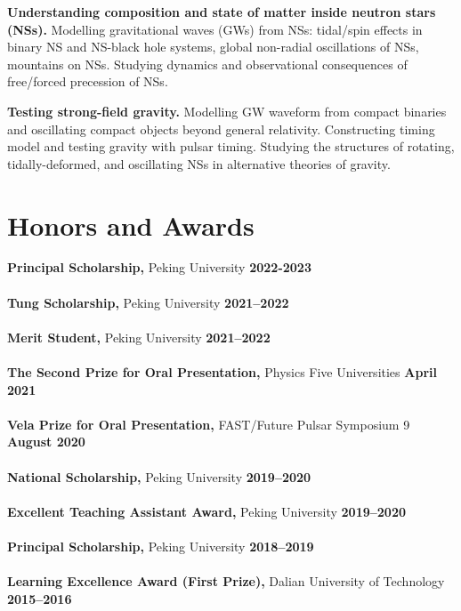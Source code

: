 \documentclass[margin,line]{res}
\begin{document}
\begin{resume}
{\bf Understanding composition and state of matter inside neutron stars (NSs).} Modelling gravitational waves (GWs) from NSs: tidal/spin effects in binary NS and NS-black hole systems, global non-radial oscillations of NSs, mountains on NSs. Studying dynamics and observational consequences of free/forced precession of NSs. 

{\bf Testing strong-field gravity.} Modelling GW waveform from compact binaries and oscillating compact objects beyond general relativity. Constructing timing model and testing gravity with pulsar timing. Studying the structures of rotating, tidally-deformed, and oscillating NSs in alternative theories of gravity.



\section{\sc Honors and Awards}
{\bf Principal Scholarship,} Peking University \hfill {\bf 2022-2023}\\
\\
{\bf Tung Scholarship,} Peking University \hfill {\bf 2021--2022}\\
\\
{\bf Merit Student,} Peking University \hfill {\bf 2021--2022}\\
\\
{\bf The Second Prize for Oral Presentation,} Physics Five Universities \hfill {\bf April 2021}\\
\\
{\bf Vela Prize for Oral Presentation,} FAST/Future Pulsar Symposium 9 \hfill {\bf August 2020}\\
\\
{\bf National Scholarship,} Peking University \hfill {\bf 2019--2020}\\
\\
{\bf Excellent Teaching Assistant Award,} Peking University \hfill {\bf 2019--2020}\\
\\
{\bf Principal Scholarship,} Peking University \hfill {\bf 2018--2019}\\
\\
{\bf Learning Excellence Award (First Prize),} Dalian University of Technology \hfill {\bf 2015--2016}\\
\\


\end{resume}
\end{document}
